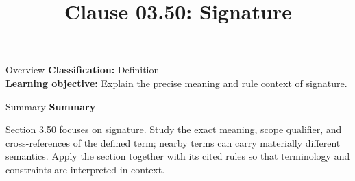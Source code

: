 \documentclass[10pt,letterpaper]{article}
\title{Clause 03.50: Signature}
\author{}
\date{}
\begin{document}
\maketitle
\begin{CornellOverviewBox}{Overview}
\textbf{Classification:} Definition\\[2pt]
\textbf{Learning objective:} Explain the precise meaning and rule context of signature.
\end{CornellOverviewBox}\begin{CornellSummaryBox}{Summary}
{\sffamily\bfseries\color{Accent} Summary}\par\vspace{3pt}Section 3.50 focuses on signature. Study the exact meaning, scope qualifier, and cross-references of the defined term; nearby terms can carry materially different semantics. Apply the section together with its cited rules so that terminology and constraints are interpreted in context.
\end{CornellSummaryBox}
\end{document}
